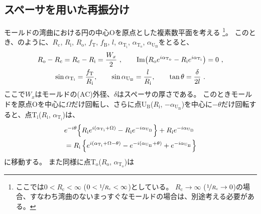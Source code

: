\subsection{スペーサを用いた再振分け}
モールドの湾曲における円の中心Oを原点とした複素数平面を考える
\footnote{ここでは$0 < R_\mathrm c < \infty$ ($0 < \nicefrac1{R_\mathrm c} < \infty$)としている。
$R_\mathrm c \to \infty$ ($\nicefrac1{R_\mathrm c} \to 0$)の場合、すなわち湾曲のないまっすぐなモールドの場合は、別途考える必要がある。}。
このとき、のように、$R_\mathrm c$, $R_\mathrm i$, $R_\mathrm o$, $f_\mathrm T$, $f_\mathrm B$, $l$, $\alpha_{\mathrm T_\mathrm i}$, $\alpha_{\mathrm T_\mathrm o}$, $\alpha_{\mathrm U_\mathrm B}$をとると、
\begin{subequations}
\begin{gather}
  \label{eq:constraintUpoint1}
  R_\mathrm o - R_\mathrm c = R_\mathrm c - R_\mathrm i = \frac{W_x}2~, \qquad
  \operatorname{Im}\!\left(R_\mathrm oe^{i\alpha_{\mathrm T_\mathrm o}} - R_\mathrm ie^{i\alpha_{\mathrm T_\mathrm i}}\right)
  = 0~,\\
  \label{eq:constraintUpoint2}
  \sin\alpha_{\mathrm T_\mathrm i} = \frac{f_\mathrm T}{R_\mathrm i}, \qquad
  \sin\alpha_{\mathrm U_\mathrm B} = \frac l{R_\mathrm i}, \qquad
  \tan\theta = \frac\delta{2l}~.
\end{gather}
\end{subequations}
ここで$W_x$はモールドの(AC)外径、$\delta$はスペーサの厚さである。
このときモールドを原点Oを中心に$\Omega$だけ回転し、さらに点U$_\mathrm B$($R_\mathrm i$, $-\alpha_{\mathrm U_\mathrm B}$)を中心に$-\theta$だけ回転すると、点T$_\mathrm i$($R_\mathrm i$, $\alpha_{\mathrm T_\mathrm i}$)は、
\begin{align}
  \notag
  & e^{-i\theta}\!\left\{R_\mathrm ie^{i(\alpha_{\mathrm T_\mathrm i} + \Omega)} - R_\mathrm ie^{-i\alpha_{\mathrm U_\mathrm B}}\right\}
    +R_\mathrm ie^{-i\alpha_{\mathrm U_\mathrm B}}\\
  &= R_\mathrm i
     \left\{
       e^{i(\alpha_{\mathrm T_\mathrm i} + \Omega - \theta)} - e^{-i(\alpha_{\mathrm U_\mathrm B} + \theta)} + e^{-i\alpha_{\mathrm U_\mathrm B}}
     \right\}
  \label{eq:afterftUpoint}
\end{align}
に移動する。
また同様に点T$_\mathrm o$($R_\mathrm o$, $\alpha_{\mathrm T_\mathrm o}$)は
